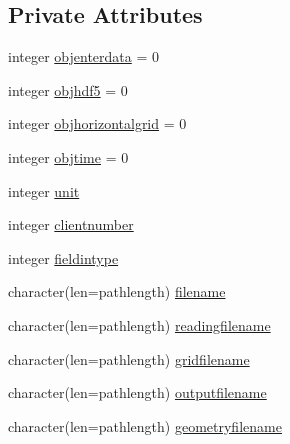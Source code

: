 \subsection*{Private Attributes}
\begin{DoxyCompactItemize}
\item 
integer \mbox{\hyperlink{structmodulenetcdfcf__2__hdf5mohid_1_1t__netcdfcf__2__hdf5mohid_adc4d0bd1091ba05599889f7109519682}{objenterdata}} = 0
\item 
integer \mbox{\hyperlink{structmodulenetcdfcf__2__hdf5mohid_1_1t__netcdfcf__2__hdf5mohid_a35eba544fbdd5f6dbbae8f7be9be9a2d}{objhdf5}} = 0
\item 
integer \mbox{\hyperlink{structmodulenetcdfcf__2__hdf5mohid_1_1t__netcdfcf__2__hdf5mohid_a69ca54e61f80a317c7505bb6d1b000b0}{objhorizontalgrid}} = 0
\item 
integer \mbox{\hyperlink{structmodulenetcdfcf__2__hdf5mohid_1_1t__netcdfcf__2__hdf5mohid_a6deeb04618bf3fbe4f5fb4041db8d59b}{objtime}} = 0
\item 
integer \mbox{\hyperlink{structmodulenetcdfcf__2__hdf5mohid_1_1t__netcdfcf__2__hdf5mohid_a945783772b8dc9fa51e9f30f0b4935b9}{unit}}
\item 
integer \mbox{\hyperlink{structmodulenetcdfcf__2__hdf5mohid_1_1t__netcdfcf__2__hdf5mohid_aab2a1f4888478fcc7cba6cf19455f7c1}{clientnumber}}
\item 
integer \mbox{\hyperlink{structmodulenetcdfcf__2__hdf5mohid_1_1t__netcdfcf__2__hdf5mohid_ae58fe51e288e0e3cc99aa10d729d5010}{fieldintype}}
\item 
character(len=pathlength) \mbox{\hyperlink{structmodulenetcdfcf__2__hdf5mohid_1_1t__netcdfcf__2__hdf5mohid_a0629b3fe8542b2a5f7cdba210303f29d}{filename}}
\item 
character(len=pathlength) \mbox{\hyperlink{structmodulenetcdfcf__2__hdf5mohid_1_1t__netcdfcf__2__hdf5mohid_afd095e0e615fdab16ef89f152c26535d}{readingfilename}}
\item 
character(len=pathlength) \mbox{\hyperlink{structmodulenetcdfcf__2__hdf5mohid_1_1t__netcdfcf__2__hdf5mohid_a16e5994bb4a264b7c0978765c5f5dae0}{gridfilename}}
\item 
character(len=pathlength) \mbox{\hyperlink{structmodulenetcdfcf__2__hdf5mohid_1_1t__netcdfcf__2__hdf5mohid_a6827cbd1488e92d75068d39ae0678da1}{outputfilename}}
\item 
character(len=pathlength) \mbox{\hyperlink{structmodulenetcdfcf__2__hdf5mohid_1_1t__netcdfcf__2__hdf5mohid_a2ed85116a88b17f57db4188a7828b15d}{geometryfilename}}
\item 

\end{DoxyCompactItemize}
